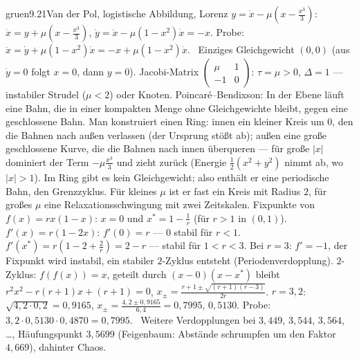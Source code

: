 \begin{loesungkarte}{gruen}{9.21}{Van der Pol, logistische Abbildung, Lorenz}
$y = \dot x - \mu(x - \frac{x^{3}}3)$: $\dot x = y + \mu(x - \frac{x^{3}}3)$, $\dot y = \ddot x - \mu(1 - x^{2})\dot x = -x$. Probe: $\ddot x = \dot y + \mu(1 - x^{2})\dot x = -x + \mu(1 - x^{2})\dot x$. \checkmark\ Einziges Gleichgewicht $(0, 0)$ (aus $\dot y = 0$ folgt $x = 0$, dann $y = 0$). Jacobi-Matrix $\begin{pmatrix}\mu&1\\-1&0\end{pmatrix}$: $\tau = \mu > 0$, $\Delta = 1$ --- instabiler Strudel ($\mu < 2$) oder Knoten. Poincaré--Bendixson: In der Ebene läuft eine Bahn, die in einer kompakten Menge ohne Gleichgewichte bleibt, gegen eine geschlossene Bahn. Man konstruiert einen Ring: innen ein kleiner Kreis um $0$, den die Bahnen nach außen verlassen (der Ursprung stößt ab); außen eine große geschlossene Kurve, die die Bahnen nach innen überqueren --- für große $|x|$ dominiert der Term $-\mu\frac{x^{3}}3$ und zieht zurück (Energie $\frac12(x^{2} + y^{2})$ nimmt ab, wo $|x| > 1$). Im Ring gibt es kein Gleichgewicht; also enthält er eine periodische Bahn, den Grenzzyklus. Für kleines $\mu$ ist er fast ein Kreis mit Radius $2$, für großes $\mu$ eine Relaxationsschwingung mit zwei Zeitskalen.
Fixpunkte von $f(x) = rx(1 - x)$: $x = 0$ und $x^{*} = 1 - \frac1r$ (für $r > 1$ in $(0, 1)$). $f'(x) = r(1 - 2x)$: $f'(0) = r$ --- $0$ stabil für $r < 1$. $f'(x^{*}) = r(1 - 2 + \frac2r) = 2 - r$ --- stabil für $1 < r < 3$. Bei $r = 3$: $f' = -1$, der Fixpunkt wird instabil, ein stabiler $2$-Zyklus entsteht (Periodenverdopplung). $2$-Zyklus: $f(f(x)) = x$, geteilt durch $(x - 0)(x - x^{*})$ bleibt $r^{2}x^{2} - r(r + 1)x + (r + 1) = 0$, $x_\pm = \frac{r + 1\pm\sqrt{(r + 1)(r - 3)}}{2r}$. $r = 3{,}2$: $\sqrt{4{,}2\cdot0{,}2} = 0{,}9165$, $x_\pm = \frac{4{,}2\pm0{,}9165}{6{,}4} = 0{,}7995$, $0{,}5130$. Probe: $3{,}2\cdot0{,}5130\cdot0{,}4870 = 0{,}7995$. \checkmark\ Weitere Verdopplungen bei $3{,}449$, $3{,}544$, $3{,}564$, \dots, Häufungspunkt $3{,}5699$ (Feigenbaum: Abstände schrumpfen um den Faktor $4{,}669$), dahinter Chaos.

\end{loesungkarte}
